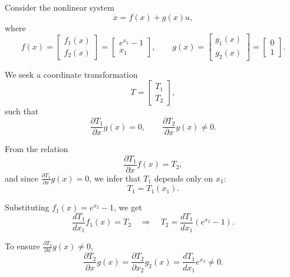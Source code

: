 \begin{example}
Consider the nonlinear system
\begin{equation}
\dot{x} = f(x) + g(x)u,
\end{equation}
where
\begin{equation}
f(x) =
\begin{bmatrix}
f_1(x) \\[3pt] f_2(x)
\end{bmatrix}
=
\begin{bmatrix}
e^{x_2} - 1 \\[3pt] x_1
\end{bmatrix}, 
\qquad
g(x) =
\begin{bmatrix}
g_1(x) \\[3pt] g_2(x)
\end{bmatrix}
=
\begin{bmatrix}
0 \\[3pt] 1
\end{bmatrix}.
\end{equation}

We seek a coordinate transformation
\begin{equation}
T =
\begin{bmatrix}
T_1 \\[3pt] T_2
\end{bmatrix},
\end{equation}
such that
\begin{equation}
\frac{\partial T_1}{\partial x} g(x) = 0, 
\qquad 
\frac{\partial T_2}{\partial x} g(x) \neq 0.
\end{equation}

From the relation
\begin{equation}
\frac{\partial T_1}{\partial x} f(x) = T_2,
\end{equation}
and since \( \frac{\partial T_1}{\partial x} g(x) = 0 \), we infer that \( T_1 \) depends only on \( x_1 \):
\begin{equation}
T_1 = T_1(x_1).
\end{equation}

Substituting \( f_1(x) = e^{x_2} - 1 \), we get
\begin{equation}
\frac{dT_1}{dx_1} f_1(x) = T_2 
\quad \Rightarrow \quad 
T_2 = \frac{dT_1}{dx_1}(e^{x_2} - 1).
\end{equation}

To ensure \( \frac{\partial T_2}{\partial x} g(x) \neq 0 \),
\begin{equation}
\frac{\partial T_2}{\partial x} g(x)
=
\frac{\partial T_2}{\partial x_2} g_2(x)
=
\frac{dT_1}{dx_1} e^{x_2} \neq 0.
\end{equation}


\end{example}
